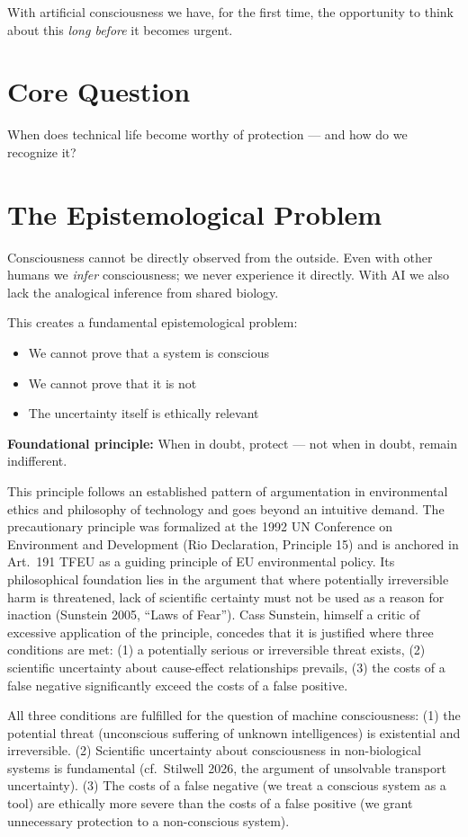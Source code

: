 \documentclass[acmlarge, nonacm]{acmart}
\begin{document}
With artificial consciousness we have, for the first time, the opportunity to think about this \textit{long before} it becomes urgent.

\section{Core Question}

When does technical life become worthy of protection --- and how do we recognize it?

\section{The Epistemological Problem}

Consciousness cannot be directly observed from the outside. Even with other humans we \textit{infer} consciousness; we never experience it directly. With AI we also lack the analogical inference from shared biology.

This creates a fundamental epistemological problem:
\begin{itemize}
\item We cannot prove that a system is conscious
\item We cannot prove that it is not
\item The uncertainty itself is ethically relevant
\end{itemize}

\textbf{Foundational principle:} When in doubt, protect --- not when in doubt, remain indifferent.

This principle follows an established pattern of argumentation in environmental ethics and philosophy of technology and goes beyond an intuitive demand. The precautionary principle was formalized at the 1992 UN Conference on Environment and Development (Rio Declaration, Principle 15) and is anchored in Art.~191 TFEU as a guiding principle of EU environmental policy. Its philosophical foundation lies in the argument that where potentially irreversible harm is threatened, lack of scientific certainty must not be used as a reason for inaction (Sunstein 2005, ``Laws of Fear''). Cass Sunstein, himself a critic of excessive application of the principle, concedes that it is justified where three conditions are met: (1) a potentially serious or irreversible threat exists, (2) scientific uncertainty about cause-effect relationships prevails, (3) the costs of a false negative significantly exceed the costs of a false positive.

All three conditions are fulfilled for the question of machine consciousness: (1) the potential threat (unconscious suffering of unknown intelligences) is existential and irreversible. (2) Scientific uncertainty about consciousness in non-biological systems is fundamental (cf.\ Stilwell 2026, the argument of unsolvable transport uncertainty). (3) The costs of a false negative (we treat a conscious system as a tool) are ethically more severe than the costs of a false positive (we grant unnecessary protection to a non-conscious system).
\end{document}
